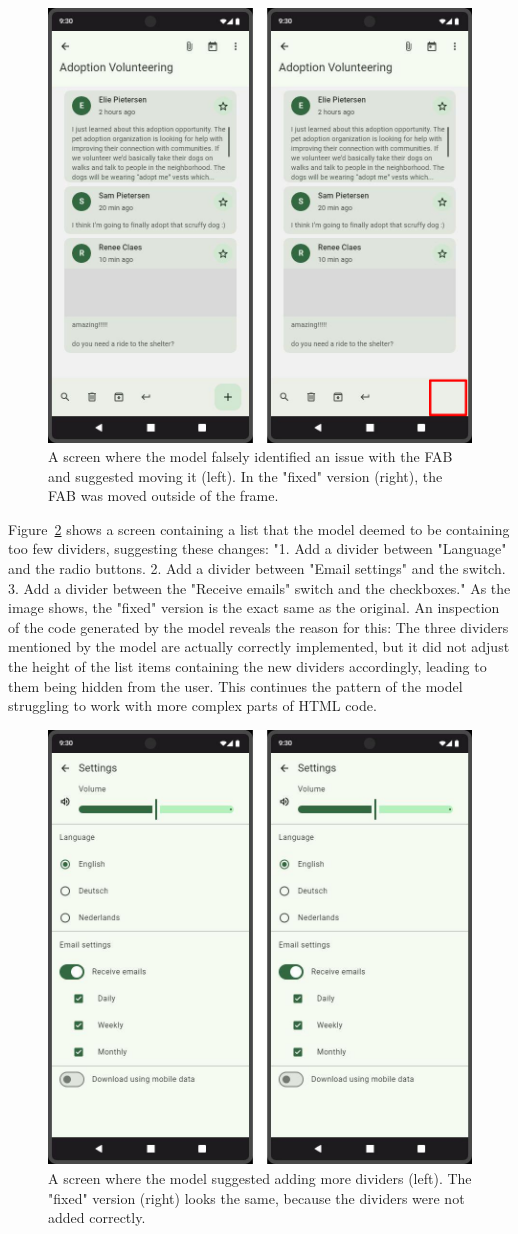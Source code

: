 \documentclass[11pt,titlepage,oneside,openany]{book}
\begin{document}
\begin{figure}[t]
	\centering
	\includegraphics[width=.56\textwidth]{figures/change_bad_ex_os_1.jpg}
	\caption{A screen where the model falsely identified an issue with the FAB and suggested moving it (left). In the "fixed" version (right), the FAB was moved outside of the frame.}
	\label{fig:change_bad_ex_os_1}
\end{figure}

Figure~\ref{fig:change_bad_ex_os_2} shows a screen containing a list that the model deemed to be containing too few dividers, suggesting these changes: "1. Add a divider between "Language" and the radio buttons. 2. Add a divider between "Email settings" and the switch. 3. Add a divider between the "Receive emails" switch and the checkboxes." As the image shows, the "fixed" version is the exact same as the original. An inspection of the code generated by the model reveals the reason for this: The three dividers mentioned by the model are actually correctly implemented, but it did not adjust the height of the list items containing the new dividers accordingly, leading to them being hidden from the user. This continues the pattern of the model struggling to work with more complex parts of HTML code.

\begin{figure}[H]
	\centering
	\includegraphics[width=.56\textwidth]{figures/change_bad_ex_os_2.jpg}
	\caption{A screen where the model suggested adding more dividers (left). The "fixed" version (right) looks the same, because the dividers were not added correctly.}
	\label{fig:change_bad_ex_os_2}
\end{figure}
\end{document}
